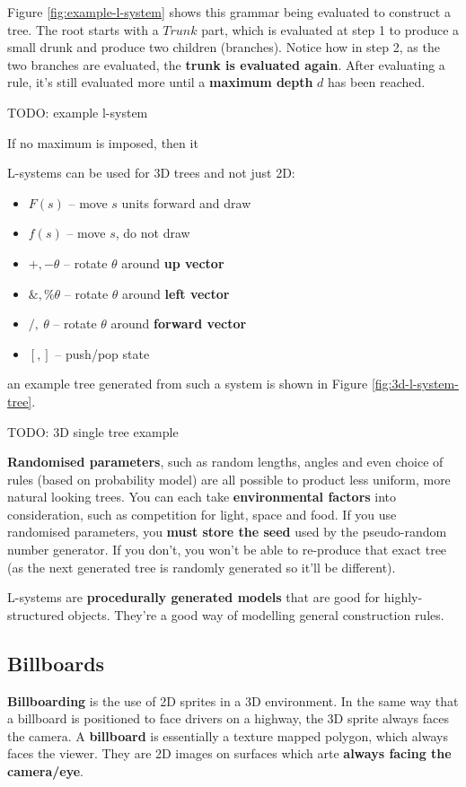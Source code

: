 \documentclass{article}
\begin{document}
Figure \ref{fig:example-l-system} shows this grammar being evaluated to construct a tree. The root starts with a $Trunk$ part, which is evaluated at step 1 to produce a small drunk and produce two children (branches). Notice how in step 2, as the two branches are evaluated, the \textbf{trunk is evaluated again}. After evaluating a rule, it's still evaluated more until a \textbf{maximum depth} $d$ has been reached.

TODO: example l-system

If no maximum is imposed, then it 

L-systems can be used for 3D trees and not just 2D:
\begin{itemize}
	\item $F(s)$ -- move $s$ units forward and draw
	\item $f(s)$ -- move $s$, do not draw
	\item $+,- \theta$ -- rotate $\theta$ around \textbf{up vector}
	\item $\&,\% \theta$ -- rotate $\theta$ around \textbf{left vector}
	\item $/,\ \theta$ -- rotate $\theta$ around \textbf{forward vector}
	\item $[,]$ -- push/pop state
\end{itemize}
an example tree generated from such a system is shown in Figure \ref{fig:3d-l-system-tree}.

TODO: 3D single tree example

\textbf{Randomised parameters}, such as random lengths, angles and even choice of rules (based on probability model) are all possible to product less uniform, more natural looking trees. You can each take \textbf{environmental factors} into consideration, such as competition for light, space and food. If you use randomised parameters, you \textbf{must store the seed} used by the pseudo-random number generator. If you don't, you won't be able to re-produce that exact tree (as the next generated tree is randomly generated so it'll be different).

L-systems are \textbf{procedurally generated models} that are good for highly-structured objects. They're a good way of modelling general construction rules.

\subsection{Billboards}

\textbf{Billboarding} is the use of 2D sprites in a 3D environment. In the same way that a billboard is positioned to face drivers on a highway, the 3D sprite always faces the camera. A \textbf{billboard} is essentially a texture mapped polygon, which always faces the viewer. They are 2D images on surfaces which arte \textbf{always facing the camera/eye}.
\end{document}
